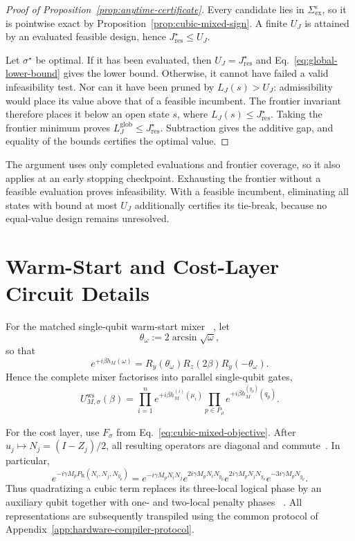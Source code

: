 \documentclass[a4paper,onecolumn,11pt,unpublished]{quantumarticle}
\theoremstyle{remark}
\begin{document}
\begin{proof}[Proof of Proposition~\ref{prop:anytime-certificate}]
Every candidate lies in $\Sigma_{\mathrm{ex}}^\varepsilon$, so it is pointwise
exact by Proposition~\ref{prop:cubic-mixed-sign}.  A finite $U_J$ is attained
by an evaluated feasible design, hence $J_{\mathrm{res}}^\star\leq U_J$.

Let $\sigma^\star$ be optimal.  If it has been evaluated, then
$U_J=J_{\mathrm{res}}^\star$ and Eq.~\eqref{eq:global-lower-bound} gives the
lower bound.  Otherwise, it cannot have failed a valid infeasibility test.
Nor can it have been pruned by $L_J(s)>U_J$: admissibility would place its
value above that of a feasible incumbent.  The frontier invariant therefore
places it below an open state $s$, where
$L_J(s)\leq J_{\mathrm{res}}^\star$.  Taking the frontier minimum proves
$L_J^{\mathrm{glob}}\leq J_{\mathrm{res}}^\star$.  Subtraction gives the
additive gap, and equality of the bounds certifies the optimal value.
\end{proof}
The argument uses only completed evaluations and frontier coverage, so it
also applies at an early stopping checkpoint.  Exhausting the frontier
without a feasible evaluation proves infeasibility.  With a feasible
incumbent, eliminating all states with bound at most $U_J$ additionally
certifies its tie-break, because no equal-value design remains unresolved.


\section{Warm-Start and Cost-Layer Circuit Details}
\label{app:warm-start-circuits}

For the matched single-qubit warm-start mixer
~\cite{Egger2021,TateCustom2023}, let
\[
\theta_\omega:=2\arcsin\sqrt{\omega},
\]
so that
\[
e^{+i\beta h_M(\omega)}
=
R_y(\theta_\omega)
R_z(2\beta)
R_y(-\theta_\omega).
\]
Hence the complete mixer factorises into parallel single-qubit gates,
\[
U_{M,\sigma}^{\mathrm{ws}}(\beta)
=
\prod_{i=1}^n e^{+i\beta h_M^{(i)}(\mu_i)}
\prod_{p\in P_\rho}e^{+i\beta h_M^{(y_p)}(q_p)}.
\]

For the cost layer, use $F_\sigma$ from Eq.~\eqref{eq:cubic-mixed-objective}.
After $u_j\mapsto N_j=(I-Z_j)/2$, all resulting operators are diagonal and
commute~\cite{Hadfield2021,CampbellDahl2022}.  In particular,
\[
e^{-i\gamma M_p P_{\mathrm R}(N_i,N_j,N_{y_p})}
=
e^{-i\gamma M_pN_iN_j}
e^{2i\gamma M_pN_iN_{y_p}}
e^{2i\gamma M_pN_jN_{y_p}}
e^{-3i\gamma M_pN_{y_p}}.
\]
Thus quadratizing a cubic term replaces its three-local logical phase by an
auxiliary qubit together with one- and two-local penalty phases
~\cite{Schmidbauer2024,Schmidbauer2026}.  All
representations are subsequently transpiled using the common protocol of
Appendix~\ref{app:hardware-compiler-protocol}.
\end{document}
